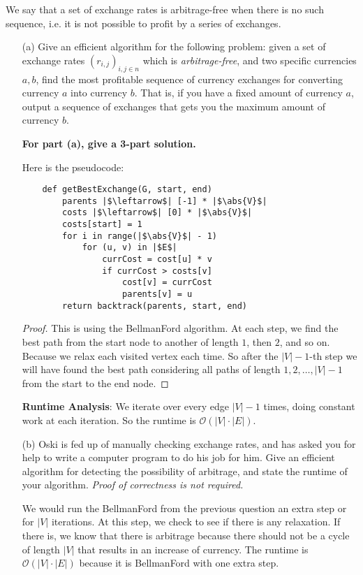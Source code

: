 \documentclass{article}
\begin{document}
We say that a set of exchange rates is arbitrage-free when there is no such sequence, i.e. it is not possible to profit by a series of exchanges.
    \begin{itemize}
        \item [(a)] Give an efficient algorithm for the following problem: given a set of exchange rates $(r_{i, j})_{i, j \in n}$ which is \textit{arbitrage-free}, and two specific currencies $a, b$, find the most profitable sequence of currency exchanges for converting currency $a$ into currency $b$. That is, if you have a fixed amount of currency $a$, output a sequence of exchanges that gets you the maximum amount of currency $b$.

        \textbf{For part (a), give a 3-part solution.}
            \begin{answer}
                Here is the pseudocode:
                \begin{verbatim}
    def getBestExchange(G, start, end)
        parents |$\leftarrow$| [-1] * |$\abs{V}$|
        costs |$\leftarrow$| [0] * |$\abs{V}$|
        costs[start] = 1
        for i in range(|$\abs{V}$| - 1)
            for (u, v) in |$E$|
                currCost = cost[u] * v
                if currCost > costs[v]
                    cost[v] = currCost
                    parents[v] = u
        return backtrack(parents, start, end)
                \end{verbatim}
                \begin{proof}
                    This is using the BellmanFord algorithm. At each step, we find the best path from the start node to another of length $1$, then $2$, and so on. Because we relax each visited vertex each time. So after the $\lvert V \rvert - 1$-th step we will have found the best path considering all paths of length $1, 2, \ldots, \lvert V \rvert - 1$ from the start to the end node.
                \end{proof}
                \textbf{Runtime Analysis}: We iterate over every edge $\lvert V \rvert - 1$ times, doing constant work at each iteration. So the runtime is $\mathcal{O}(\lvert V \rvert \cdot \lvert E \rvert)$.
            \end{answer}


        \item [(b)] Oski is fed up of manually checking exchange rates, and has asked you for help to write a computer program to do his job for him. Give an efficient algorithm for detecting the possibility of arbitrage, and state the runtime of your algorithm. \textit{Proof of correctness is not required.}
            \begin{answer}
                We would run the BellmanFord from the previous question an extra step or for $\lvert V \rvert$ iterations. At this step, we check to see if there is any relaxation. If there is, we know that there is arbitrage because there should not be a cycle of length $\lvert V \rvert$ that results in an increase of currency. The runtime is $\mathcal{O}(\lvert V \rvert \cdot \lvert E \rvert)$ because it is BellmanFord with one extra step.
            \end{answer}
    \end{itemize}
\end{document}
